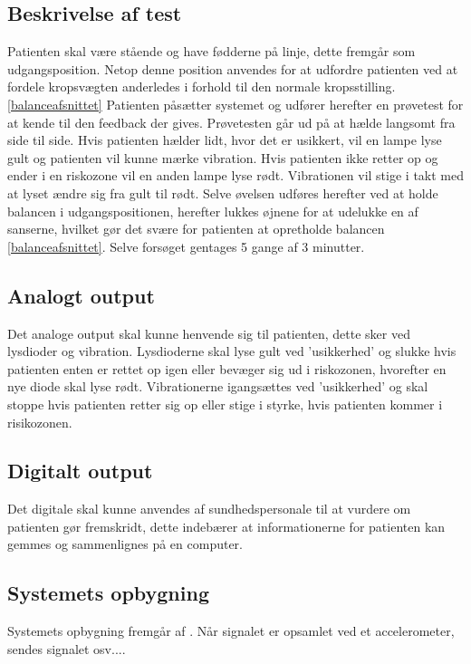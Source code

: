 \subsection{Beskrivelse af test}
Patienten skal være stående og have fødderne på linje, dette fremgår som udgangsposition. Netop denne position anvendes for at udfordre patienten ved at fordele kropsvægten anderledes i forhold til den normale kropsstilling.\ref{balanceafsnittet} Patienten påsætter systemet og udfører herefter en prøvetest for at kende til den feedback der gives. Prøvetesten går ud på at hælde langsomt fra side til side. Hvis patienten hælder lidt, hvor det er usikkert, vil en lampe lyse gult og patienten vil kunne mærke vibration. Hvis patienten ikke retter op og ender i en riskozone vil en anden lampe lyse rødt. Vibrationen vil stige i takt med at lyset ændre sig fra gult til rødt. Selve øvelsen udføres herefter ved at holde balancen i udgangspositionen, herefter lukkes øjnene for at udelukke en af sanserne, hvilket gør det svære for patienten at opretholde balancen \ref{balanceafsnittet}. Selve forsøget gentages 5 gange af 3 minutter.

\subsection{Analogt output}
Det analoge output skal kunne henvende sig til patienten, dette sker ved lysdioder og vibration. Lysdioderne skal lyse gult ved 'usikkerhed' og slukke hvis patienten enten er rettet op igen eller bevæger sig ud i riskozonen, hvorefter en nye diode skal lyse rødt. Vibrationerne igangsættes ved 'usikkerhed' og skal stoppe hvis patienten retter sig op eller stige i styrke, hvis patienten kommer i risikozonen. 

\subsection{Digitalt output}
Det digitale skal kunne anvendes af sundhedspersonale til at vurdere om patienten gør fremskridt, dette indebærer at informationerne for patienten kan gemmes og sammenlignes på en computer. 


\subsection{Systemets opbygning}
Systemets opbygning fremgår af . Når signalet er opsamlet ved et accelerometer, sendes signalet osv....

